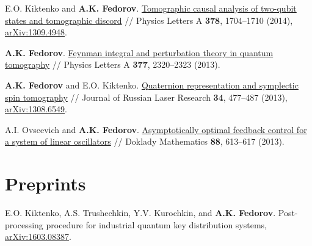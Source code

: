 \documentclass[10pt,a4paper,sans]{moderncv}
\begin{document}
	{E.O. Kiktenko and \textbf{A.K. Fedorov}. 
	{\textcolor{blue}{\href{http://dx.doi.org/10.1016/j.physleta.2014.04.036}{Tomographic causal analysis of two-qubit states and tomographic discord}}} //  
	Physics Letters A \textbf{378},  1704--1710 (2014), {\textcolor{blue}{\href{http://arxiv.org/abs/1309.4948}{arXiv:1309.4948}}}.}

	{\textbf{A.K. Fedorov}. 
	{\textcolor{blue}{\href{http://dx.doi.org/10.1016/j.physleta.2013.07.020}{Feynman integral and perturbation theory in quantum tomography}}} // 
	Physics Letters A \textbf{377},  2320--2323 (2013).}
	
	{\textbf{A.K. Fedorov} and E.O. Kiktenko. 
	{\textcolor{blue}{\href{http://dx.doi.org/10.1007/s10946-013-9378-z}{Quaternion representation and symplectic spin tomography}}} // 
	Journal of Russian Laser Research \textbf{34}, 477--487 (2013), 
	{\textcolor{blue}{\href{http://arxiv.org/abs/1308.6549}{arXiv:1308.6549}}}.}
	
	{A.I. Ovseevich  and \textbf{A.K. Fedorov}. 
	{\textcolor{blue}{\href{http://dx.doi.org/10.1134/S106456241305013X}{Asymptotically optimal feedback control for a system of linear oscillators}}} // 
	Doklady Mathematics \textbf{88}, 613--617 (2013).}
	
\iffalse
	
	\cvline{\textcolor{blue}{2} \quad 2013}
	{A.I. Ovseevich  and \textbf{A.K. Fedorov}. 
	{\textcolor{blue}{\href{http://www.unn.ru/eng/publications/vestnik.html?anum=6280}{Feedback bounded control for a system of oscillators}}} // 
	Vestnik of Lobachevsky State University of Nizhni Novgorod \textbf{1}, 278--283 (2013) [In Russian}.}
	
	\cvline{\textcolor{blue}{1} \quad 2012}
	{\textbf{A.K. Fedorov} and S.\,O.\,Yurchenko. 
	{\textcolor{blue}{\href{http://vestniken.bmstu.ru/eng/catalog/phys/hidden/81.html}{Symplectic tomograms presented through Feynman path integrals}}} // 
	Herald of the Bauman Moscow State Technical University \textbf{45}, 29--37 (2012) [In Russian].}
	
\fi
	
\section{Preprints}

	{E.O. Kiktenko, A.S. Trushechkin, Y.V. Kurochkin, and {\textbf{A.K. Fedorov}. 
	Post-processing procedure for industrial quantum key distribution systems,
	{\textcolor{blue}{\href{http://arxiv.org/abs/1603.08387}{arXiv:1603.08387}}}.}}
\end{document}

